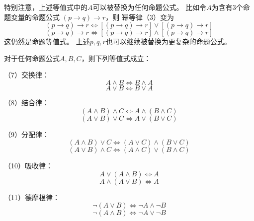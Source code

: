 特别注意，上述等值式中的$A$可以被替换为任何命题公式。
比如令$A$为含有3个命题变量的命题公式
$(p\rightarrow q)\rightarrow r$，则
幂等律（3）变为
$$(p\rightarrow q)\rightarrow r
\Leftrightarrow [(p\rightarrow q)\rightarrow r]
\vee [(p\rightarrow q)\rightarrow r]$$
$$(p\rightarrow q)\rightarrow r
\Leftrightarrow [(p\rightarrow q)\rightarrow r]
\wedge [(p\rightarrow q)\rightarrow r]$$
这仍然是命题等值式。
上述$p,q,r$也可以继续被替换为更复杂的命题公式。

\begin{thm}[基本的命题公式等值式II]\label{prop-dengzhi-gongshi-2}
对于任何命题公式$A,B,C$，则下列等值式成立：

（7）交换律：$$A\wedge B\Leftrightarrow B\wedge A$$
$$A\vee B\Leftrightarrow B\vee A$$

（8）结合律：$$(A\wedge B)\wedge C\Leftrightarrow A\wedge (B\wedge C)$$
$$(A\vee B)\vee C\Leftrightarrow A\vee (B\vee C)$$

（9）分配律：
$$(A\wedge B)\vee C\Leftrightarrow (A\vee C)\wedge (B\vee C)$$
$$(A\vee B)\wedge C\Leftrightarrow (A\wedge C)\vee (B\wedge C)$$

（10）吸收律：
$$A\vee (A\wedge B)\Leftrightarrow A$$
$$A\wedge (A\vee B)\Leftrightarrow A$$

（11）德摩根律：
$$\neg(A\vee B)\Leftrightarrow\neg A\wedge\neg B$$
$$\neg(A\wedge B)\Leftrightarrow\neg A\vee\neg B$$

\end{thm}

